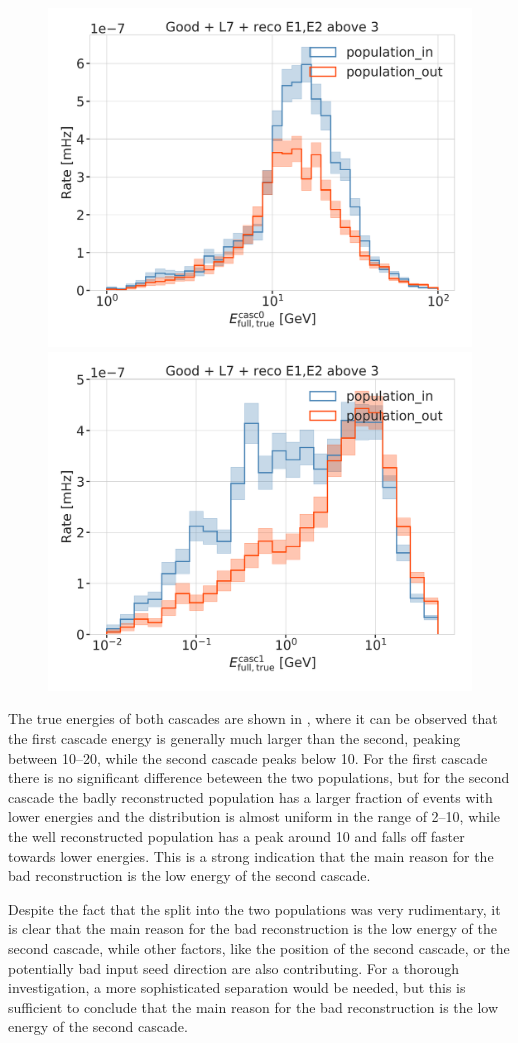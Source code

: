 \begin{figure}[h]
    \centering
    \includegraphics[width=0.49\linewidth]{figures/results/190607/second_population/casc0_energy.png}
    \includegraphics[width=0.49\linewidth]{figures/results/190607/second_population/casc1_energy.png}
    \caption[]{}
\end{figure}

The true energies of both cascades are shown in , where it can be observed that the first cascade energy is generally much larger than the second, peaking between \SIrange[range-phrase={~and~}]{10}{20}{\gev}, while the second cascade peaks below \SI{10}{\gev}. For the first cascade there is no significant difference beteween the two populations, but for the second cascade the badly reconstructed population has a larger fraction of events with lower energies and the distribution is almost uniform in the range of \SIrange{2}{10}{\gev}, while the well reconstructed population has a peak around \SI{10}{\gev} and falls off faster towards lower energies. This is a strong indication that the main reason for the bad reconstruction is the low energy of the second cascade.

Despite the fact that the split into the two populations was very rudimentary, it is clear that the main reason for the bad reconstruction is the low energy of the second cascade, while other factors, like the position of the second cascade, or the potentially bad input seed direction are also contributing. For a thorough investigation, a more sophisticated separation would be needed, but this is sufficient to conclude that the main reason for the bad reconstruction is the low energy of the second cascade.

